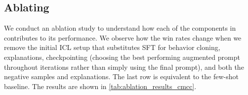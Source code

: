 \begin{table*}[]
\small
    \centering
    \caption{Representative Fightin' Words model~\cite{monroe2008fightin} results for frequency differences between two sources at $p<0.05$. A positive z-score indicates that output source A significantly uses more of the n-gram than B while a negative score signals the opposite. 
    We observe that the models that have higher win-rates from pairwise comparisons frequently generate phrases for expressing personal opinions while the losing model generates more formal phrases. 
    }
    \label{tab:fightin_words_model_results}
\end{table*}

\subsection{Ablating \ours}

We conduct an ablation study to understand how each of the components in \ours contributes to its performance. 
We observe how the win rates change when we remove the initial ICL setup that substitutes SFT for behavior cloning, explanations, checkpointing (choosing the best performing augmented prompt throughout iterations rather than simply using the final prompt), and both the negative samples and explanations.
The last row is equivalent to the few-shot baseline. 
The results are shown in \autoref{tab:ablation_results_cmcc}. 


